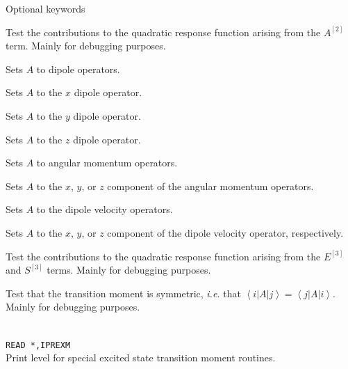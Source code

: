 \noindent Optional keywords

\begin{description}

\item{}
Test the contributions to the quadratic response function arising from
the $A^{\left[2\right]}$ term. Mainly for debugging purposes.

\item{}
Sets $A$ to dipole operators.

\item{}
Sets $A$ to the $x$ dipole operator.

\item{}
Sets $A$ to the $y$ dipole operator.

\item{}
Sets $A$ to the $z$ dipole operator.

\item{}
Sets $A$ to angular momentum operators.

\item{}
Sets $A$ to the $x$, $y$, or $z$ component of the angular momentum operators.

\item{}
Sets $A$ to the dipole velocity operators.

\item{}
Sets $A$ to the $x$, $y$, or $z$ component of the dipole velocity
operator, respectively.

\item{}
Test the contributions to the quadratic response function arising from
the $E^{\left[3\right]}$ and $S^{\left[3\right]}$ terms.  Mainly for
debugging purposes.

\item{}
Test that the transition moment is symmetric, {\it i.e.\/} that
$\left<i\left|A\right|j\right> =
\left<j\left|A\right|i\right>$. Mainly for debugging purposes.

\item{}\\
\verb|READ *,IPREXM|\\
Print level for special excited state transition moment routines.


\end{description}
